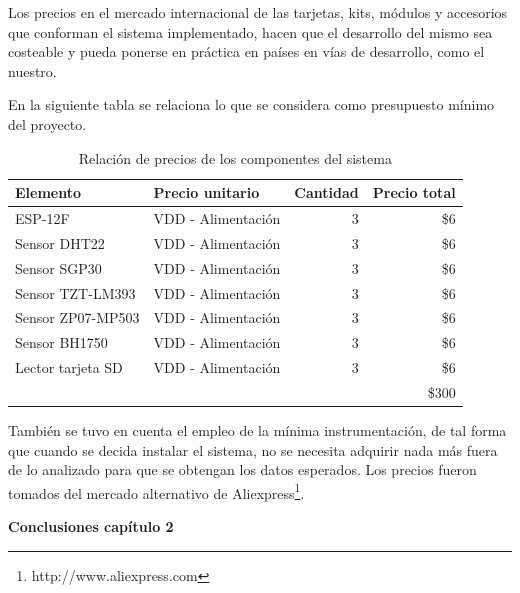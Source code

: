 Los precios en el mercado internacional de las tarjetas, kits, módulos y accesorios que conforman el sistema implementado, hacen que el desarrollo del mismo sea costeable y pueda ponerse en práctica en países en vías de desarrollo, como el nuestro.

En la siguiente tabla se relaciona lo que se considera como presupuesto mínimo del proyecto.

\begin{table}[H]
    \centering
    \caption{Relación de precios de los componentes del sistema}
    \label{tab:precios_componentes}
    \begin{tabular}{|l|l|r|r|}
    \hline
    \cellcolor[HTML]{9698ED}Elemento    & \cellcolor[HTML]{9698ED}Precio unitario  & \cellcolor[HTML]{9698ED}Cantidad  & \cellcolor[HTML]{9698ED}Precio total  \\ \hline
    ESP-12F                             & VDD - Alimentación                       & 3                                 & \$6                                   \\ \hline
    Sensor DHT22                        & VDD - Alimentación                       & 3                                 & \$6                                   \\ \hline
    Sensor SGP30                        & VDD - Alimentación                       & 3                                 & \$6                                   \\ \hline
    Sensor TZT-LM393                    & VDD - Alimentación                       & 3                                 & \$6                                   \\ \hline
    Sensor ZP07-MP503                   & VDD - Alimentación                       & 3                                 & \$6                                   \\ \hline
    Sensor BH1750                       & VDD - Alimentación                       & 3                                 & \$6                                   \\ \hline
    Lector tarjeta SD                   & VDD - Alimentación                       & 3                                 & \$6                                   \\ \hline
                                        &                                          &                                   & \$300                                 \\ \hline
    \end{tabular}
\end{table}

También se tuvo en cuenta el empleo de la mínima instrumentación, de tal forma que cuando se decida instalar el sistema, no se necesita adquirir nada más fuera de lo analizado para que se obtengan los datos esperados.
Los precios fueron tomados del mercado alternativo de Aliexpress\footnote{http://www.aliexpress.com}.\\

        \textbf{\Large Conclusiones capítulo 2}\newline
